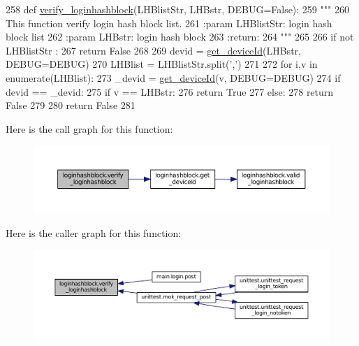 \begin{DoxyCode}
258 \textcolor{keyword}{def }\hyperlink{namespaceloginhashblock_aa5bb94484a68d0bbebce23b4cfeeb4b7}{verify\_loginhashblock}(LHBlistStr, LHBstr, DEBUG=False):
259     \textcolor{stringliteral}{"""}
260 \textcolor{stringliteral}{    This function verify login hash block list.}
261 \textcolor{stringliteral}{    :param LHBlistStr: login hash block list}
262 \textcolor{stringliteral}{    :param LHBstr: login hash block}
263 \textcolor{stringliteral}{    :return:}
264 \textcolor{stringliteral}{    """}
265 
266     \textcolor{keywordflow}{if} \textcolor{keywordflow}{not} LHBlistStr :
267         \textcolor{keywordflow}{return} \textcolor{keyword}{False}
268 
269     devid = \hyperlink{namespaceloginhashblock_a17417f2f6bca76ab51170082a562e5f6}{get\_deviceId}(LHBstr, DEBUG=DEBUG)
270     LHBlist = LHBlistStr.split(\textcolor{stringliteral}{','})
271 
272     \textcolor{keywordflow}{for} i,v \textcolor{keywordflow}{in} enumerate(LHBlist):
273         \_devid = \hyperlink{namespaceloginhashblock_a17417f2f6bca76ab51170082a562e5f6}{get\_deviceId}(v, DEBUG=DEBUG)
274         \textcolor{keywordflow}{if} devid == \_devid:
275             \textcolor{keywordflow}{if} v == LHBstr:
276                 \textcolor{keywordflow}{return} \textcolor{keyword}{True}
277             \textcolor{keywordflow}{else}:
278                 \textcolor{keywordflow}{return} \textcolor{keyword}{False}
279 
280     \textcolor{keywordflow}{return} \textcolor{keyword}{False}
281 
\end{DoxyCode}


Here is the call graph for this function\+:
\nopagebreak
\begin{figure}[H]
\begin{center}
\leavevmode
\includegraphics[width=350pt]{namespaceloginhashblock_aa5bb94484a68d0bbebce23b4cfeeb4b7_cgraph}
\end{center}
\end{figure}




Here is the caller graph for this function\+:
\nopagebreak
\begin{figure}[H]
\begin{center}
\leavevmode
\includegraphics[width=350pt]{namespaceloginhashblock_aa5bb94484a68d0bbebce23b4cfeeb4b7_icgraph}
\end{center}
\end{figure}




